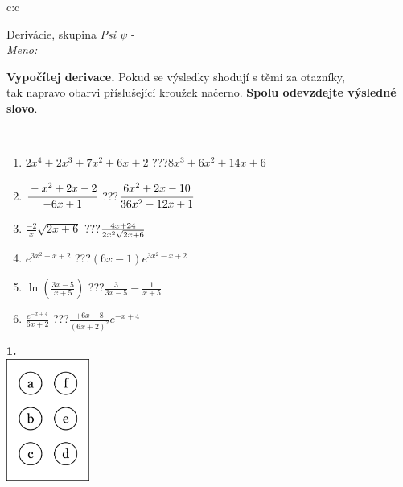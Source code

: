 \documentclass[10pt]{report}
\begin{document}
\begin{tabular}{c:c}
\begin{minipage}[c][104.5mm][t]{0.5\linewidth}
\begin{center}
\vspace{7mm}
{\huge Derivácie, skupina \textit{Psi $\psi$} -}\\[5mm]
\textit{Meno:}\phantom{xxxxxxxxxxxxxxxxxxxxxxxxxxxxxxxxxxxxxxxxxxxxxxxxxxxxxxxxxxxxxxxxx}\\[5mm]
\begin{minipage}{0.95\linewidth}
\begin{center}
\textbf{Vypočítej derivace.} Pokud se výsledky shodují s těmi za otazníky,\\tak napravo obarvi příslušející kroužek načerno. \textbf{Spolu odevzdejte výsledné slovo}.
\end{center}
\end{minipage}
\\[1mm]
\begin{minipage}{0.79\linewidth}
\begin{center}
\begin{varwidth}{\linewidth}
\begin{enumerate}
\normalsize
\item $2x^4+2x^3+7x^2+6x+2$\quad \dotfill\; ???\;\dotfill \quad $8x^3+6x^2+14x+6$
\item $\cfrac{-x^2+2x-2}{-6x+1}$\quad \dotfill\; ???\;\dotfill \quad $\cfrac{6x^2+2x-10}{36x^2-12x+1}$
\item $\frac{-2}{x}\sqrt{2x+6}$\quad \dotfill\; ???\;\dotfill \quad $\frac{4x+24}{2x^2 \sqrt{\smash[b]{2x+6}}}$
\item $e^{3x^2-x+2}$\quad \dotfill\; ???\;\dotfill \quad $(6x-1)e^{3x^2-x+2}$
\item $\ln{\left(\frac{3x-5}{x+5}\right)}$\quad \dotfill\; ???\;\dotfill \quad $\frac{3}{3x-5}-\frac{1}{x+5}$
\item $\frac{e^{-x+4}}{6x+2}$\quad \dotfill\; ???\;\dotfill \quad $\frac{+6x-8}{(6x+2)^2}e^{-x+4}$
\end{enumerate}
\end{varwidth}
\end{center}
\end{minipage}
\begin{minipage}{0.20\linewidth}
\begin{center}
{\Huge\bfseries 1.} \\[2mm]
\includegraphics[height=40mm]{../images/braille.png}

\end{center}
\end{minipage}
\end{center}
\end{minipage}
\end{tabular}
\end{document}
